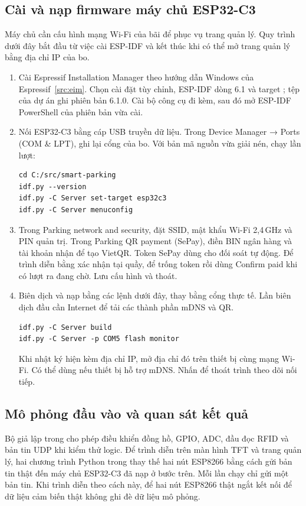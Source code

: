 \subsection{Cài và nạp firmware máy chủ ESP32-C3}
Máy chủ cần cấu hình mạng Wi-Fi của bãi để phục vụ trang quản lý. Quy trình dưới đây bắt đầu từ việc cài ESP-IDF và kết thúc khi có thể mở trang quản lý bằng địa chỉ IP của bo.

\begin{enumerate}
\item Cài Espressif Installation Manager theo hướng dẫn Windows của Espressif~\ref{src:eim}. Chọn cài đặt tùy chỉnh, ESP-IDF dòng 6.1 và target ; tệp  của dự án ghi phiên bản 6.1.0. Cài bộ công cụ đi kèm, sau đó mở ESP-IDF PowerShell của phiên bản vừa cài.
\item Nối ESP32-C3 bằng cáp USB truyền dữ liệu. Trong Device Manager → Ports (COM \& LPT), ghi lại cổng của bo. Với bản mã nguồn vừa giải nén, chạy lần lượt:
\begin{lstlisting}[style=shell]
cd C:/src/smart-parking
idf.py --version
idf.py -C Server set-target esp32c3
idf.py -C Server menuconfig
\end{lstlisting}
\item Trong Parking network and security, đặt SSID, mật khẩu Wi-Fi 2,4\,GHz và PIN quản trị. Trong Parking QR payment (SePay), điền BIN ngân hàng và tài khoản nhận để tạo VietQR. Token SePay dùng cho đối soát tự động. Để trình diễn bằng xác nhận tại quầy, để trống token rồi dùng Confirm paid khi có lượt ra đang chờ. Lưu cấu hình và thoát.
\item Biên dịch và nạp bằng các lệnh dưới đây, thay  bằng cổng thực tế. Lần biên dịch đầu cần Internet để tải các thành phần mDNS và QR.
\begin{lstlisting}[style=shell]
idf.py -C Server build
idf.py -C Server -p COM5 flash monitor
\end{lstlisting}
Khi nhật ký hiện  kèm địa chỉ IP, mở địa chỉ đó trên thiết bị cùng mạng Wi-Fi. Có thể dùng  nếu thiết bị hỗ trợ mDNS. Nhấn \code{Ctrl+]} để thoát trình theo dõi nối tiếp.
\end{enumerate}

\subsection{Mô phỏng đầu vào và quan sát kết quả}
Bộ giả lập trong  cho phép điều khiển đồng hồ, GPIO, ADC, đầu đọc RFID và bản tin UDP khi kiểm thử logic. Để trình diễn trên màn hình TFT và trang quản lý, hai chương trình Python trong  thay thế hai nút ESP8266 bằng cách gửi bản tin thật đến máy chủ ESP32-C3 đã nạp ở bước trên. Mỗi lần chạy chỉ gửi một bản tin. Khi trình diễn theo cách này, để hai nút ESP8266 thật ngắt kết nối để dữ liệu cảm biến thật không ghi đè dữ liệu mô phỏng.

